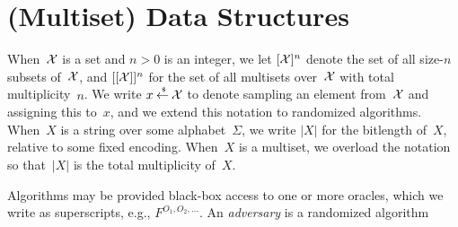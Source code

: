 \section{(Multiset) Data Structures}

 When~${\cal X}$ is a set and $n>0$ is an
integer, we let $[{\cal X}]^n$ denote the set of all size-$n$ subsets
of~${\cal X}$, and $[[{\cal X}]]^n$ for the set of all multisets
over~${\cal X}$ with total multiplicity~$n$.  We write $x {\:\stackrel{{\scriptscriptstyle \hspace{0.2em}\$}} {\leftarrow}\:} {\cal X}$ to denote
sampling an element from~${\cal X}$ and assigning this to~$x$, and we
extend this notation to randomized algorithms.  When~$X$ is a string
over some alphabet~$\Sigma$, we write $|X|$ for the bitlength
of~$X$, relative to some fixed encoding.  When~$X$ is a multiset, we
overload the notation so that~$|X|$ is the total multiplicity of~$X$.

Algorithms may be provided black-box access to one or more oracles, which we write as superscripts, e.g., $F^{O_1,O_2,\ldots}$.  An \emph{adversary} is a randomized algorithm

